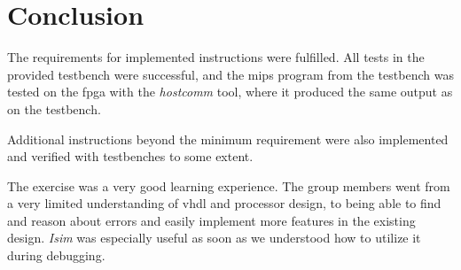 \chapter{Conclusion}
The requirements for implemented instructions were fulfilled.
All tests in the provided testbench were successful,
and the \gls{mips} program from the testbench was tested on the \gls{fpga} with the \textit{hostcomm} tool,
where it produced the same output as on the testbench.

Additional instructions beyond the minimum requirement were also implemented and verified with testbenches to some extent.

The exercise was a very good learning experience.
The group members went from a very limited understanding of \gls{vhdl} and processor design,
to being able to find and reason about errors and easily implement more features in the existing design.
\textit{Isim} was especially useful as soon as we understood how to utilize it during debugging.
